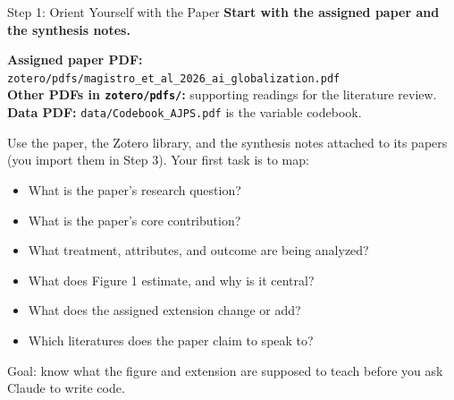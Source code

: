 \documentclass[aspectratio=169, 11pt]{beamer}
\begin{document}
\begin{frame}{Step 1: Orient Yourself with the Paper}
  \textbf{Start with the assigned paper and the synthesis notes.}

  \vspace{0.3em}
  {\small
  \textbf{Assigned paper PDF:} \nolinkurl{zotero/pdfs/magistro_et_al_2026_ai_globalization.pdf}\\
  \textbf{Other PDFs in \texttt{zotero/pdfs/}:} supporting readings for the literature review.\\
  \textbf{Data PDF:} \nolinkurl{data/Codebook_AJPS.pdf} is the variable codebook.
  }

  \vspace{0.4em}
  Use the paper, the Zotero library, and the synthesis notes attached to its papers (you import them in Step 3). Your first task is to map:
  \begin{itemize}\small
    \item What is the paper's research question?
    \item What is the paper's core contribution?
    \item What treatment, attributes, and outcome are being analyzed?
    \item What does Figure 1 estimate, and why is it central?
    \item What does the assigned extension change or add?
    \item Which literatures does the paper claim to speak to?
  \end{itemize}

  \vspace{0.5em}
  \alert{\small Goal: know what the figure and extension are supposed to teach before you ask Claude to write code.}
\end{frame}
\end{document}
